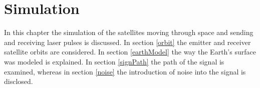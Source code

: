 \chapter{Simulation}
\label{simulation}
In this chapter the simulation of the satellites moving through space and sending and receiving laser pulses is discussed. In section \ref{orbit} the emitter and receiver satellite orbits are considered. In section \ref{earthModel} the way the Earth's surface was modeled is explained. In section \ref{signPath} the path of the signal is examined, whereas in section \ref{noise} the introduction of noise into the signal is disclosed.